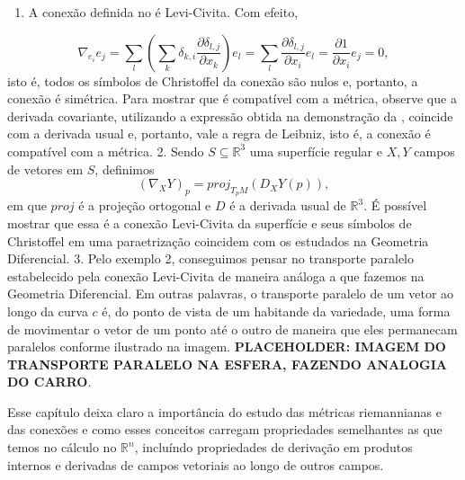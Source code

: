 \begin{examples}
    \label{loc:exemplos_:_conexão_levi:civita_e_transporte_paralelo.exemplos}
    \begin{enumerate}
        \item A conexão definida no  é Levi-Civita. Com efeito,
    \end{enumerate}
    \begin{equation*}
        \nabla_{e_{i}}e_{j}=\sum_{l}\left( \sum_{k}\delta_{k,i}\frac{\partial\delta_{l,j}}{\partial x_{k}} \right)e_{l} = \sum_{l}\frac{\partial\delta_{l,j}}{\partial x_{i}}e_{l}=\frac{\partial1}{\partial x_{i}}e_{j}=0,
    \end{equation*}
    isto é, todos os símbolos de Christoffel da conexão são nulos e, portanto, a conexão é simétrica. Para mostrar que é compatível com a métrica, observe que a derivada covariante, utilizando a expressão obtida na demonstração da , coincide com a derivada usual e, portanto, vale a regra de Leibniz, isto é, a conexão é compatível com a métrica.
    2. Sendo $S \subseteq \mathbb{R}^{3}$ uma superfície regular e $X,Y$ campos de vetores em $S$, definimos
    \begin{equation*}
        (\nabla_{X}Y)_{p}=proj_{T_{p}M}(D_{X}Y(p)),
    \end{equation*}
    em que $proj$ é a projeção ortogonal e $D$ é a derivada usual de $\mathbb{R}^{3}$. É possível mostrar que essa é a conexão Levi-Civita da superfície e seus símbolos de Christoffel em uma paraetrização coincidem com os estudados na Geometria Diferencial.
    3. Pelo exemplo 2, conseguimos pensar no transporte paralelo estabelecido pela conexão Levi-Civita de maneira análoga a que fazemos na Geometria Diferencial. Em outras palavras, o transporte paralelo de um vetor ao longo da curva $c$ é, do ponto de vista de um habitande da variedade, uma forma de movimentar o vetor de um ponto até o outro de maneira que eles permanecam paralelos conforme ilustrado na imagem. \textbf{PLACEHOLDER: IMAGEM DO TRANSPORTE PARALELO NA ESFERA, FAZENDO ANALOGIA DO CARRO}.
\end{examples}
Esse capítulo deixa claro a importância do estudo das métricas riemannianas e das conexões e como esses conceitos carregam propriedades semelhantes as que temos no cálculo no $\mathbb{R}^{n}$, incluíndo propriedades de derivação em produtos internos e derivadas de campos vetoriais ao longo de outros campos.